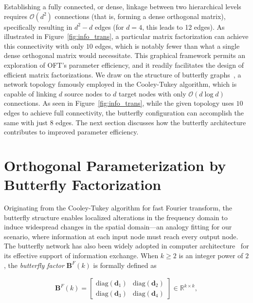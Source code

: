 Establishing a fully connected, or dense, linkage between two hierarchical levels requires $\mathcal{O}(d^2)$ connections (that is, forming a dense orthogonal matrix), specifically resulting in $d^2-d$ edges (for $d=4$, this leads to 12 edges). As illustrated in Figure~\ref{fig:info_trans}, a particular matrix factorization can achieve this connectivity with only $10$ edges, which is notably fewer than what a single dense orthogonal matrix would necessitate. This graphical framework permits an exploration of OFT's parameter efficiency, and it readily facilitates the design of efficient matrix factorizations. We draw on the structure of butterfly graphs~\cite{cooley1965algorithm}, a network topology famously employed in the Cooley-Tukey algorithm, which is capable of linking $d$ source nodes to $d$ target nodes with only $\mathcal{O}(d\log d)$ connections. As seen in Figure~\ref{fig:info_trans}, while the given topology uses $10$ edges to achieve full connectivity, the butterfly configuration can accomplish the same with just $8$ edges. The next section discusses how the butterfly architecture contributes to improved parameter efficiency.

\section{Orthogonal Parameterization by Butterfly Factorization}

Originating from the Cooley-Tukey algorithm for fast Fourier transform, the butterfly structure enables localized alterations in the frequency domain to induce widespread changes in the spatial domain—an analogy fitting for our scenario, where information at each input node must reach every output node. The butterfly network has also been widely adopted in computer architecture~\cite{solihin2015fundamentals,li2011linear} for its effective support of information exchange. When $k\geq 2$ is an integer power of $2$, the \emph{butterfly factor} $\bm{B}^F(k)$ is formally defined as

\begin{equation}\label{eq:but_factor}
\begin{aligned}
    \bm{B}^F(k)=\begin{bmatrix}
    \text{diag}(\bm{d}_1) & \text{diag}(\bm{d}_2) \\
    \text{diag}(\bm{d}_3) & \text{diag}(\bm{d}_4)
    \end{bmatrix}\in\mathbb{R}^{k\times k},
\end{aligned}
\end{equation}

